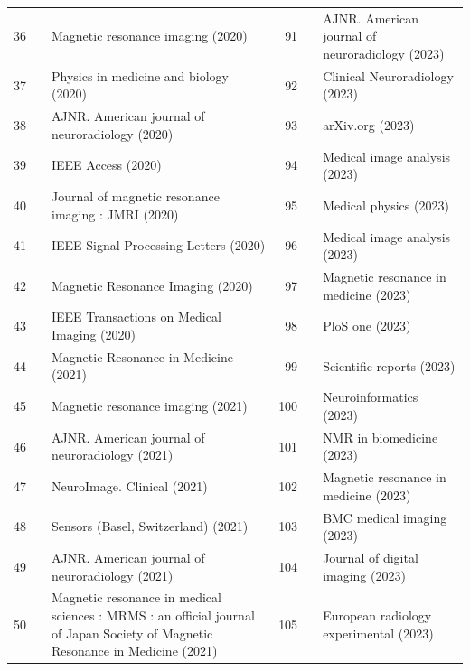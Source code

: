 \documentclass[11pt]{article}
\begin{document}
{\begin{longtable}{r l p{} r l p{}}
36 & \cite{benjamin2020diagnostic} & Magnetic resonance imaging (2020) & 91 & \cite{lang2023clinical} & AJNR. American journal of neuroradiology (2023) \\
37 & \cite{hampe2020investigating} & Physics in medicine and biology (2020) & 92 & \cite{johannes2023comparison} & Clinical Neuroradiology (2023) \\
38 & \cite{vanderhasselt2020synthetic} & AJNR. American journal of neuroradiology (2020) & 93 & \cite{chen2023ddcisenet} & arXiv.org (2023) \\
39 & \cite{du2020brain} & IEEE Access (2020) & 94 & \cite{pizarro2023deep} & Medical image analysis (2023) \\
40 & \cite{hales2020combined} & Journal of magnetic resonance imaging : JMRI (2020) & 95 & \cite{hossbach2023deep} & Medical physics (2023) \\
41 & \cite{chung2020restoration} & IEEE Signal Processing Letters (2020) & 96 & \cite{li2023diffusion} & Medical image analysis (2023) \\
42 & \cite{liu2020motion} & Magnetic Resonance Imaging (2020) & 97 & \cite{shan2023distortioncorrected} & Magnetic resonance in medicine (2023) \\
43 & \cite{wang2020synthesize} & IEEE Transactions on Medical Imaging (2020) & 98 & \cite{thaler2023effect} & PloS one (2023) \\
44 & \cite{meng2020accelerating} & Magnetic Resonance in Medicine (2021) & 99 & \cite{usui2023evaluation} & Scientific reports (2023) \\
45 & \cite{zhang2021apiremc} & Magnetic resonance imaging (2021) & 100 & \cite{ciceri2023geometric} & Neuroinformatics (2023) \\
46 & \cite{ding2021acceleration} & AJNR. American journal of neuroradiology (2021) & 101 & \cite{ramosllordn2023highfidelity} & NMR in biomedicine (2023) \\
47 & \cite{harper2021assessing} & NeuroImage. Clinical (2021) & 102 & \cite{ji2023highly} & Magnetic resonance in medicine (2023) \\
48 & \cite{duong2021correcting} & Sensors (Basel, Switzerland) (2021) & 103 & \cite{simk2023improving} & BMC medical imaging (2023) \\
49 & \cite{bash2021deep} & AJNR. American journal of neuroradiology (2021) & 104 & \cite{jiang2023multimodal} & Journal of digital imaging (2023) \\
50 & \cite{sagawa2021deep} & Magnetic resonance in medical sciences : MRMS : an official journal of Japan Society of Magnetic Resonance in Medicine (2021) & 105 & \cite{tabari2023optimized} & European radiology experimental (2023) \\

\end{longtable}}
\end{document}
